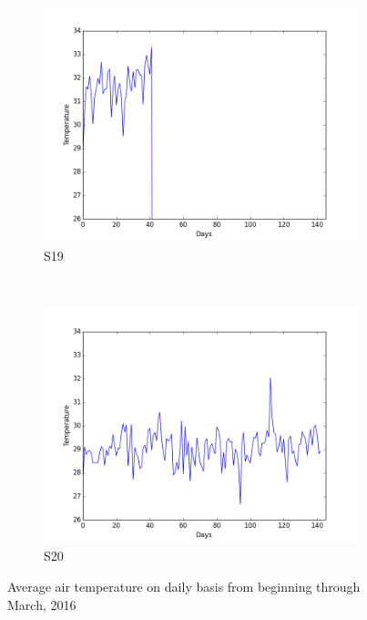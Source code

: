 \documentclass[12pt]{article} %
\begin{document}
\begin{figure}[H]
    \begin{subfigure}[b]{0.2\textwidth}
        \includegraphics[width=\textwidth]{img/graphs/19-airtemp-1}
        \caption{S19}
        \label{fig:s19AT}
    \end{subfigure}
    ~ %
    \begin{subfigure}[b]{0.2\textwidth}
        \includegraphics[width=\textwidth]{img/graphs/20-airtemp-1}
        \caption{S20}
        \label{fig:s20AT}
    \end{subfigure}
    \caption{Average air temperature on daily basis from beginning through March, 2016}
    \label{fig:avgAirTemp1}
\end{figure}
\end{document}

